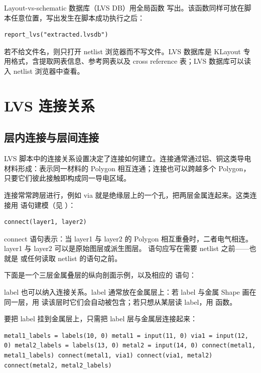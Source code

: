 Layout-vs-schematic 数据库（LVS DB）用全局函数  写出。该函数同样可放在脚本任意位置，写出发生在脚本成功执行之后：

\begin{lstlisting}
report_lvs("extracted.lvsdb")
\end{lstlisting}

若不给文件名，则只打开 netlist 浏览器而不写文件。LVS 数据库是 KLayout 专用格式，含提取网表信息、参考网表以及 cross reference 表；LVS 数据库可以读入 netlist 浏览器中查看。

\section{LVS 连接关系}\label{sec:lvs_connect}

\subsection{层内连接与层间连接}

LVS 脚本中的连接关系设置决定了连接如何建立。连接通常通过铝、铜这类导电材料形成：表示同一材料的 Polygon 相互连通；连接也可以跨越多个 Polygon，只要它们彼此接触即构成同一导电区域。

连接常常跨层进行，例如 via 就是绝缘层上的一个孔，把两层金属连起来。这类连接用  语句建模（见 ）：

\begin{lstlisting}
connect(layer1, layer2)
\end{lstlisting}

connect 语句表示：当 layer1 与 layer2 的 Polygon 相互重叠时，二者电气相连。layer1 与 layer2 可以是原始图层或派生图层。 语句应写在需要 netlist 之前——也就是  或任何读取 netlist 的语句之前。

下面是一个三层金属叠层的纵向剖面示例，以及相应的  语句：


label 也可以纳入连接关系。label 通常放在金属层上：若 label 与金属 Shape 画在同一层，用  读该层时它们会自动被包含；若只想从某层读 label，用  函数。

要把 label 挂到金属层上，只需把 label 层与金属层连接起来：

\begin{lstlisting}
metal1_labels = labels(10, 0) metal1 = input(11, 0) via1 = input(12, 0) metal2_labels = labels(13, 0) metal2 = input(14, 0) connect(metal1, metal1_labels) connect(metal1, via1) connect(via1, metal2) connect(metal2, metal2_labels)
\end{lstlisting}

